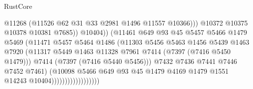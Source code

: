 \begin{lexlean}{RustCore}
\begin{coremodule}
                                                @11268
                                                (@11526 @62 @31 @33 @2981 @1496 @11557 @10366)))
                                            @10372
                                            @10375
                                            @10378
                                            @10381
                                            @7685))
                                        @10404))
                                    (@11461
                                      @649
                                      @93
                                      @45
                                      @5457
                                      @5466
                                      @1479
                                      @5469
                                      (@11471
                                        @5457
                                        @5464
                                        @1486
                                        (@11303
                                          @5456
                                          @5463
                                          @1456
                                          @5439
                                          @1463
                                          @7920
                                          (@11317
                                            @5449
                                            @1463
                                            @11328
                                            @7961
                                            @7414
                                            (@7397 (@7416 @5450 @1479)))
                                          @7414
                                          (@7397 (@7416 @5440 @5456)))
                                        @7432
                                        @7436
                                        @7441
                                        @7446
                                        @7452
                                        @7461)
                                      (@10098
                                        @5466
                                        @649
                                        @93
                                        @45
                                        @1479
                                        @4169
                                        @1479
                                        @1551
                                        @14243
                                        @10404))))))))))))))))))

\end{coremodule}
\end{lexlean}
